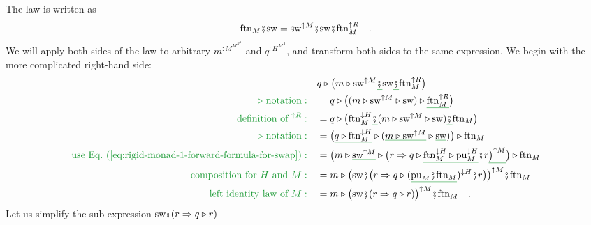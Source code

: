 The law is written as
\begin{equation}
\vspace{-0.25cm}\text{ftn}_{M}\bef\text{sw}=\text{sw}^{\uparrow M}\bef\text{sw}\bef\text{ftn}_{M}^{\uparrow R}\quad.\label{eq:swap-law-4-formulation-R-M}
\end{equation}
We will apply both sides of the law to arbitrary $m^{:M^{M^{R^{A}}}}$
and $q^{:H^{M^{A}}}$, and transform both sides to the same expression.
We begin with the more complicated right-hand side:
\begin{align}
 & q\triangleright\big(m\triangleright\text{sw}^{\uparrow M}\gunderline{\bef}\text{sw}\gunderline{\bef}\text{ftn}_{M}^{\uparrow R}\big)\nonumber \\
{\color{greenunder}\triangleright\text{ notation}:}\quad & =q\triangleright\big((m\triangleright\text{sw}^{\uparrow M}\triangleright\text{sw})\triangleright\gunderline{\text{ftn}_{M}^{\uparrow R}}\big)\nonumber \\
{\color{greenunder}\text{definition of }^{\uparrow R}:}\quad & =q\triangleright\big(\text{ftn}_{M}^{\downarrow H}\gunderline{\bef}(m\triangleright\text{sw}^{\uparrow M}\triangleright\text{sw})\gunderline{\bef}\text{ftn}_{M}\big)\nonumber \\
{\color{greenunder}\triangleright\text{ notation}:}\quad & =\big(\gunderline{q\triangleright\text{ftn}_{M}^{\downarrow H}}\triangleright(\gunderline{m\triangleright\text{sw}^{\uparrow M}}\triangleright\gunderline{\text{sw}})\big)\triangleright\text{ftn}_{M}\nonumber \\
{\color{greenunder}\text{use Eq.~(\ref{eq:rigid-monad-1-forward-formula-for-swap})}:}\quad & =\big(m\triangleright\gunderline{\text{sw}^{\uparrow M}}\triangleright\big(r\Rightarrow q\triangleright\gunderline{\text{ftn}_{M}^{\downarrow H}\triangleright\text{pu}_{M}^{\downarrow H}}\bef r\gunderline{\big)^{\uparrow M}}\big)\triangleright\text{ftn}_{M}\nonumber \\
{\color{greenunder}\text{composition for }H\text{ and }M:}\quad & =m\triangleright\big(\text{sw}\bef\big(r\Rightarrow q\triangleright(\gunderline{\text{pu}_{M}\bef\text{ftn}_{M}})^{\downarrow H}\bef r\big)\big)^{\uparrow M}\bef\text{ftn}_{M}\nonumber \\
{\color{greenunder}\text{left identity law of }M:}\quad & =m\triangleright\big(\text{sw}\bef(r\Rightarrow q\triangleright r)\big)^{\uparrow M}\bef\text{ftn}_{M}\quad.\label{eq:rigid-monad-1-swap-law-4-derivation-5}
\end{align}
Let us simplify the sub-expression $\text{sw}\bef(r\Rightarrow q\triangleright r)$
